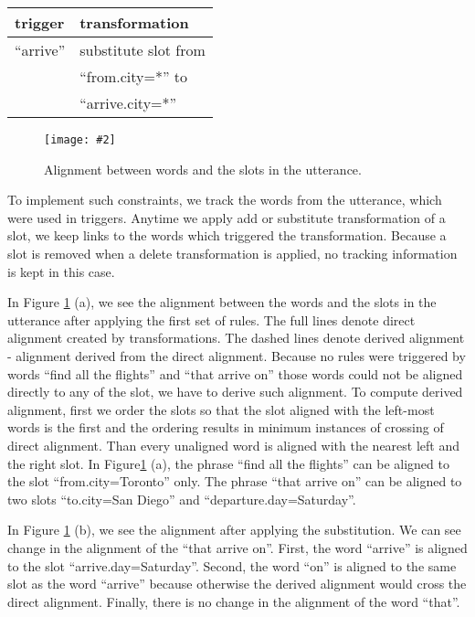 \documentclass[11pt]{article}
\newcommand{\fgrparam}[4]{
  \begin{figure}[htbp]
    \begin{center}
      \leavevmode
      \texttt{[image: \#2]}
    \end{center}
    \caption{#4}
    \label{#3}
  \end{figure}
}
\begin{document}
\vspace{.25cm}
\begin{tabular}{ll}
  trigger & transformation \\
  \hline 
  ``arrive''            & substitute slot from\\
                        & ``from.city=*'' to \\
                        & ``arrive.city=*'' \\
\end{tabular} 
\vspace{.25cm}

\fgrparam{width=8cm}{./fig/words-slots-alignment.pdf}{fig:alignment}{Alignment between words and the slots in the utterance.}

To implement such constraints, we track the words from the utterance, which were used in triggers. Anytime we apply add or substitute transformation of a slot, we keep links to the words which triggered the transformation. Because a slot is removed when a delete transformation is applied, no tracking information is kept in this case. 

In Figure \ref{fig:alignment} (a), we see the alignment between the words and the slots in the utterance after applying the first set of rules. The full lines denote direct alignment created by transformations. The dashed lines denote derived alignment - alignment derived from the direct alignment. Because no rules were triggered by words ``find all the flights'' and ``that arrive on'' those words could not be aligned directly to any of the slot, we have to derive such alignment. To compute derived alignment, first we order the slots so that the slot aligned with the left-most words is the first and the ordering results in minimum instances of crossing of direct alignment. Than every unaligned word is aligned with the nearest left and the right slot. In Figure\ref{fig:alignment} (a), the phrase ``find all the flights'' can be aligned to the slot ``from.city=Toronto'' only. The phrase ``that arrive on'' can be aligned to two slots ``to.city=San Diego'' and ``departure.day=Saturday''.

In Figure \ref{fig:alignment} (b), we see the alignment after applying the substitution. We can see change in the alignment of the ``that arrive on''. First, the word ``arrive'' is aligned to the slot ``arrive.day=Saturday''. Second, the word ``on'' is aligned to the same slot as the word ``arrive'' because  otherwise the derived alignment would cross the direct alignment. Finally, there is no change in the alignment of the word ``that''.
\end{document}
